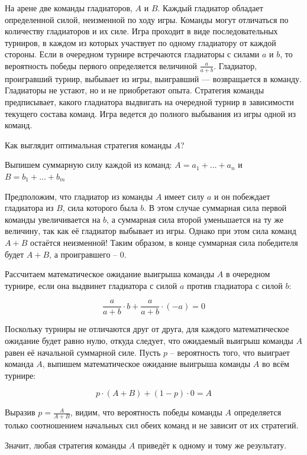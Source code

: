 \documentclass[nobib]{tufte-handout}
\theoremstyle{definition}
\newcounter{problem}
\newenvironment{problem}%
{%
\refstepcounter{problem}%
     \hypertarget{problem:{\theproblem}}{}
     \Writetofile{solution_file}{\protect\hypertarget{soln:\theproblem}{}}
     \begin{myenum}[label=\bfseries\protect\hyperlink{soln:\theproblem}{\theproblem},ref=\theproblem]
     \item%
    }%
    {%
    \end{myenum}}
\begin{document}
\begin{problem}
На арене две команды гладиаторов,  $A$  и  $B$. Каждый гладиатор обладает определенной силой, неизменной по ходу игры. Команды могут отличаться по количеству гладиаторов и их силе. Игра проходит в виде последовательных турниров, в каждом из которых участвует по одному гладиатору от каждой стороны. Если в очередном турнире встречаются гладиаторы с силами  $a$  и  $b$, то вероятность победы первого определяется величиной  $\frac{a}{a+b}$. Гладиатор, проигравший турнир, выбывает из игры, выигравший — возвращается в команду. Гладиаторы не устают, но и не приобретают опыта. Стратегия команды предписывает, какого гладиатора выдвигать на очередной турнир в зависимости текущего состава команд. Игра ведется до полного выбывания из игры одной из команд.

Как выглядит оптимальная стратегия команды $A$?

\begin{sol}
Выпишем суммарную силу каждой из команд: $A = a_1 + \ldots  + a_n$ и $B=  b_1 + \ldots  + b_m$

Предположим, что гладиатор из команды $A$ имеет силу $a$ и он побеждает гладиатора из $B$, сила которого была $b$. В этом случае суммарная сила первой команды увеличивается на $b$, а суммарная сила второй уменьшается на ту же величину, так как её гладиатор выбывает из игры. Однако при этом сила команд $A+B$ остаётся неизменной! Таким образом, в конце суммарная сила победителя будет $A+B$, а проигравшего – $0$.

Рассчитаем математическое ожидание выигрыша команды $A$ в очередном турнире, если она выдвинет гладиатора с силой $a$ против гладиатора с силой $b$:

\[
\frac{a}{a+b} \cdot b + \frac{a}{a+b} \cdot (-a) = 0
\]

Поскольку турниры не отличаются друг от друга, для каждого математическое ожидание будет равно нулю, откуда следует, что ожидаемый выигрыш команды $A$ равен её начальной суммарной силе. Пусть $p$ – вероятность того, что выиграет команда $A$, выпишем математическое ожидание выигрыша команды $A$ во всём турнире:

\[
p \cdot (A+B)+(1-p) \cdot 0=A
\]

Выразив $p = \frac{A}{A+B}$, видим, что вероятность победы команды $A$ определяется только соотношением начальных сил обеих команд и не зависит от их стратегий.

Значит, любая стратегия команды $A$ приведёт к одному и тому же результату.
\end{sol}

\end{problem}
\end{document}
